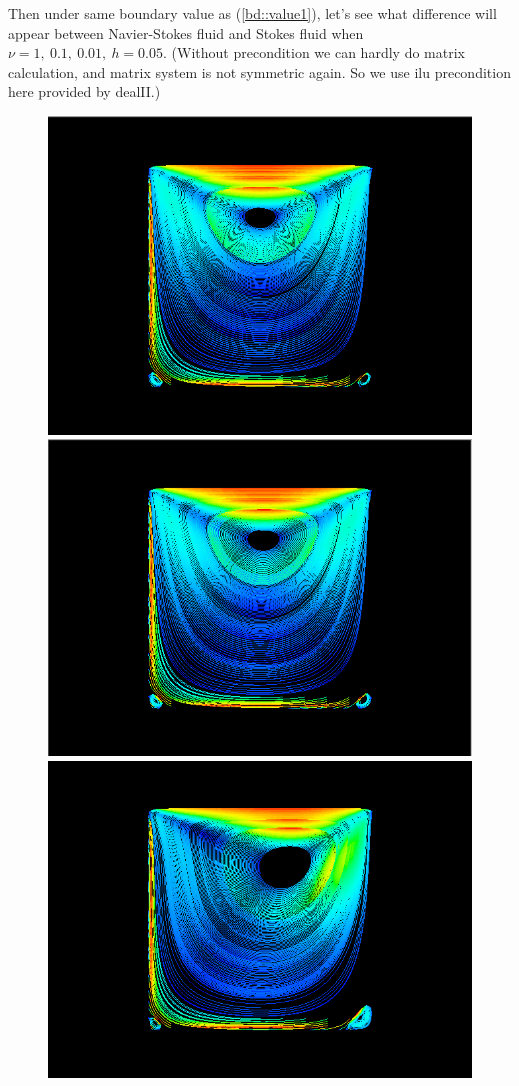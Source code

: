 \documentclass[a4paper]{article}
\begin{document}
\indent Then under same boundary value as (\ref{bd::value1}), let's see what difference will appear between Navier-Stokes fluid and Stokes fluid when $\nu=1,\ 0.1,\ 0.01,\ h=0.05$. (Without precondition we can hardly do matrix calculation, and matrix system is not symmetric again. So we use ilu precondition here provided by dealII.)
\begin{figure}[h]
\centering
\includegraphics[scale = 0.2]{a.png}
\includegraphics[scale = 0.2]{b.png}
\includegraphics[scale = 0.2]{c.png}

\end{figure}
\end{document}
